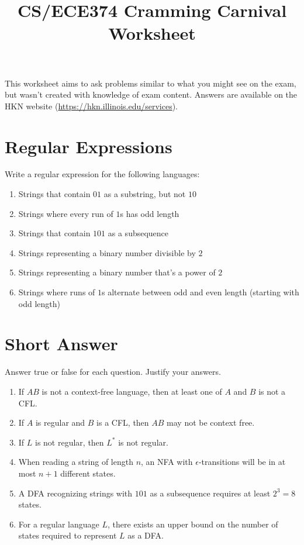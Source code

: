 \documentclass[fleqn]{article}
\title{CS/ECE374 Cramming Carnival Worksheet}
\author{}
\date{}
\begin{document}
\maketitle

\begin{center}
    This worksheet aims to ask problems similar to what you might see on the exam, but wasn't created with knowledge of exam content. Answers are available on the HKN website (\hyperlink{https://hkn.illinois.edu/services}{https://hkn.illinois.edu/services}).
\end{center}

\section{Regular Expressions}
Write a regular expression for the following languages:
\begin{enumerate}
    \item Strings that contain $01$ as a substring, but not $10$
    \item Strings where every run of $1$s has odd length
    \item Strings that contain $101$ as a subsequence
    \item Strings representing a binary number divisible by $2$
    \item Strings representing a binary number that's a power of $2$
    \item Strings where runs of $1$s alternate between odd and even length (starting with odd length)
\end{enumerate}

\section{Short Answer}
Answer true or false for each question. Justify your answers.
\begin{enumerate}
    \item If $AB$ is not a context-free language, then at least one of $A$ and $B$ is not a CFL.
    \item If $A$ is regular and $B$ is a CFL, then $AB$ may not be context free.
    \item If $L$ is not regular, then $L^*$ is not regular.
    \item When reading a string of length $n$, an NFA with $\epsilon$-transitions will be in at most $n+1$ different states.
    \item A DFA recognizing strings with $101$ as a subsequence requires at least $2^3 = 8$ states.
    \item For a regular language $L$, there exists an upper bound on the number of states required to represent $L$ as a DFA.
\end{enumerate}
\end{document}
